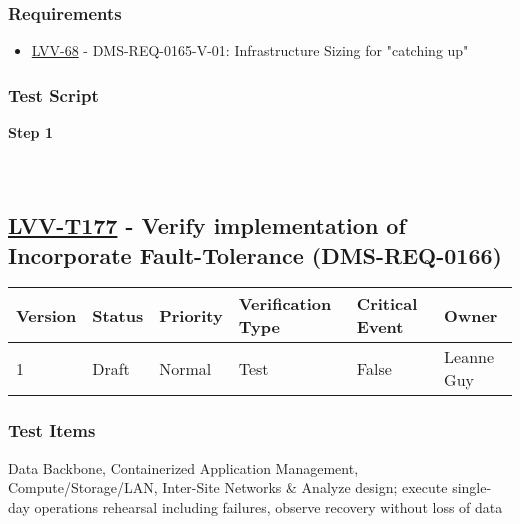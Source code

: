 \hypertarget{requirements-153}{%
\subsubsection{Requirements}\label{requirements-153}}

\begin{itemize}
\tightlist
\item
  \href{https://jira.lsstcorp.org/browse/LVV-68}{LVV-68} -
  DMS-REQ-0165-V-01: Infrastructure Sizing for "catching up"
\end{itemize}

\hypertarget{test-script-153}{%
\subsubsection{Test Script}\label{test-script-153}}

\textbf{Step 1}\\
~\\
~\\

\hypertarget{lvv-t177---verify-implementation-of-incorporate-fault-tolerance-dms-req-0166}{%
\subsection{\texorpdfstring{\href{https://jira.lsstcorp.org/secure/Tests.jspa\#/testCase/LVV-T177}{LVV-T177}
- Verify implementation of Incorporate Fault-Tolerance
(DMS-REQ-0166)}{LVV-T177 - Verify implementation of Incorporate Fault-Tolerance (DMS-REQ-0166)}}\label{lvv-t177---verify-implementation-of-incorporate-fault-tolerance-dms-req-0166}}

\begin{longtable}[]{@{}llllll@{}}
\toprule
Version & Status & Priority & Verification Type & Critical Event &
Owner\tabularnewline
\midrule
\endhead
1 & Draft & Normal & Test & False & Leanne Guy\tabularnewline
\bottomrule
\end{longtable}

\hypertarget{test-items-153}{%
\subsubsection{Test Items}\label{test-items-153}}

Data Backbone, Containerized Application Management,
Compute/Storage/LAN, Inter-Site Networks \& Analyze design; execute
single-day operations rehearsal including failures, observe recovery
without loss of data

